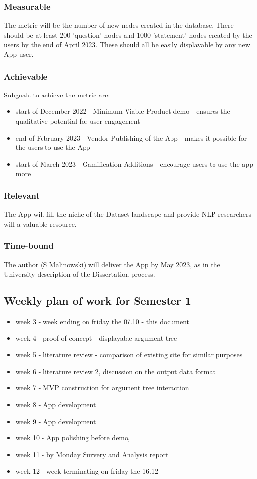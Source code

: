 \documentclass{article}
\begin{document}
\subsubsection*{Measurable}
  The metric will be the number of new nodes created in the database. There should be at least 200 'question' nodes and 1000 'statement' nodes created by the users by the end of April 2023.
  These should all be easily displayable by any new App user.

\subsubsection*{Achievable}
Subgoals to achieve the metric are:
\begin{itemize}
  \item start of December 2022 - Minimum Viable Product demo - ensures the qualitative potential for user engagement
  \item end of February 2023 - Vendor Publishing of the App - makes it possible for the users to use the App
  \item start of March 2023 - Gamification Additions - encourage users to use the app more
\end{itemize}

\subsubsection*{Relevant}
The App will fill the niche of the Dataset landscape and provide NLP researchers will a valuable resource.

\subsubsection*{Time-bound}
The author (S Malinowski) will deliver the App by May 2023, as in the University description of the Dissertation process.

\subsection*{Weekly plan of work for Semester 1}

\begin{itemize}
  \item week 3 - week ending on friday the 07.10 - this document
  \item week 4 - proof of concept - displayable argument tree
  \item week 5 - literature review - comparison of existing site for similar purposes
  \item week 6 - literature review 2, discussion on the output data format
  \item week 7 - MVP construction for argument tree interaction
  \item week 8 - App development
  \item week 9 - App development
  \item week 10 - App polishing before demo, 
  \item week 11 - by Monday Survery and Analysis report
  \item week 12 - week terminating on friday the 16.12
\end{itemize}
\end{document}

